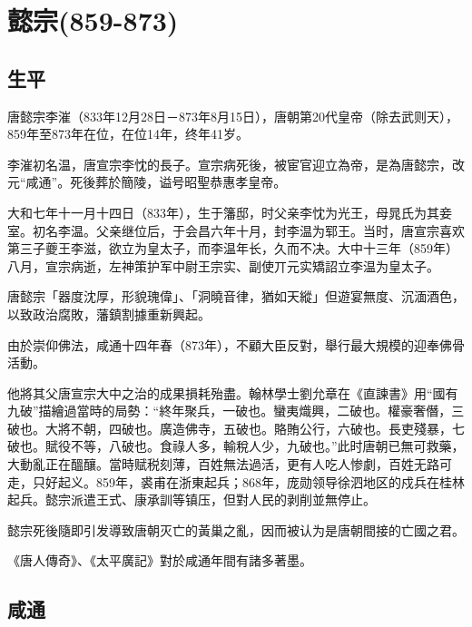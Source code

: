 
\section{懿宗\tiny(859-873)}

\subsection{生平}

唐懿宗李漼（833年12月28日－873年8月15日），唐朝第20代皇帝（除去武则天），859年至873年在位，在位14年，终年41岁。

李漼初名温，唐宣宗李忱的長子。宣宗病死後，被宦官迎立為帝，是為唐懿宗，改元“咸通”。死後葬於簡陵，谥号昭聖恭惠孝皇帝。

大和七年十一月十四日（833年），生于籓邸，时父亲李忱为光王，母晁氏为其妾室。初名李温。父亲继位后，于会昌六年十月，封李温为郓王。当时，唐宣宗喜欢第三子夔王李滋，欲立为皇太子，而李温年长，久而不决。大中十三年（859年）八月，宣宗病逝，左神策护军中尉王宗实、副使丌元实矯詔立李温为皇太子。

唐懿宗「器度沈厚，形貌瑰偉」、「洞曉音律，猶如天縱」但遊宴無度、沉湎酒色，以致政治腐敗，藩鎮割據重新興起。

由於崇仰佛法，咸通十四年春（873年），不顧大臣反對，舉行最大規模的迎奉佛骨活動。

他將其父唐宣宗大中之治的成果損耗殆盡。翰林學士劉允章在《直諫書》用“國有九破”描繪過當時的局勢：“終年聚兵，一破也。蠻夷熾興，二破也。權豪奢僭，三破也。大將不朝，四破也。廣造佛寺，五破也。賂賄公行，六破也。長吏殘暴，七破也。賦役不等，八破也。食祿人多，輸稅人少，九破也。”此时唐朝已無可救藥，大動亂正在醞釀。當時赋税刻薄，百姓無法過活，更有人吃人惨劇，百姓无路可走，只好起义。859年，裘甫在浙東起兵；868年，庞勋领导徐泗地区的戍兵在桂林起兵。懿宗派遣王式、康承訓等镇压，但對人民的剥削並無停止。

懿宗死後隨即引发導致唐朝灭亡的黃巢之亂，因而被认为是唐朝間接的亡國之君。

《唐人傳奇》、《太平廣記》對於咸通年間有諸多著墨。

\subsection{咸通}

